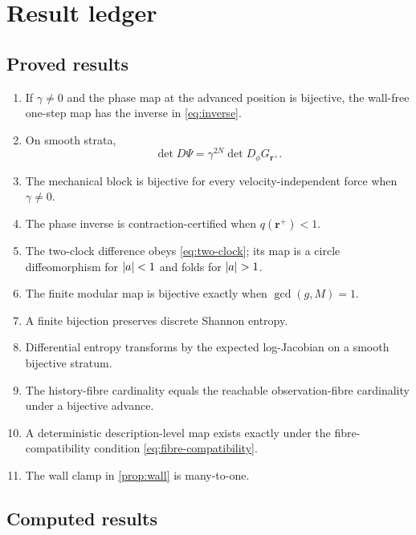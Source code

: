 \section{Result ledger}
\label{app:ledger}

\subsection{Proved results}

\begin{enumerate}
\item If \(\gamma\neq0\) and the phase map at the advanced position is bijective, the wall-free one-step map has the inverse in \cref{eq:inverse}.
\item On smooth strata,
\[
\det D\Psi
=
\gamma^{2N}\det D_\phi G_{\bm r^+}.
\]
\item The mechanical block is bijective for every velocity-independent force when \(\gamma\neq0\).
\item The phase inverse is contraction-certified when \(q(\bm r^+)<1\).
\item The two-clock difference obeys \cref{eq:two-clock}; its map is a circle diffeomorphism for \(\left\lvert a\right\rvert<1\) and folds for \(\left\lvert a\right\rvert>1\).
\item The finite modular map is bijective exactly when \(\gcd(g,M)=1\).
\item A finite bijection preserves discrete Shannon entropy.
\item Differential entropy transforms by the expected log-Jacobian on a smooth bijective stratum.
\item The history-fibre cardinality equals the reachable observation-fibre cardinality under a bijective advance.
\item A deterministic description-level map exists exactly under the fibre-compatibility condition \cref{eq:fibre-compatibility}.
\item The wall clamp in \cref{prop:wall} is many-to-one.
\end{enumerate}

\subsection{Computed results}

